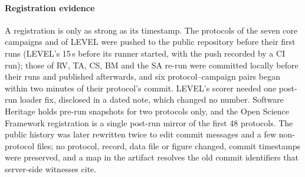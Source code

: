 \paragraph{Registration evidence}
A registration is only as strong as its timestamp. The protocols of the
seven core campaigns and of LEVEL were pushed to the public repository
before their first runs (LEVEL's 15\,s before its runner started, with the
push recorded by a CI run); those of RV, TA, CS, BM and the SA re-run were
committed locally before their runs and published afterwards, and six
protocol--campaign pairs began within two minutes of their protocol's
commit. LEVEL's scorer needed one post-run loader fix, disclosed in a dated
note, which changed no number. Software
Heritage holds pre-run snapshots for two protocols only, and the Open
Science Framework registration is a single post-run mirror of the first 48
protocols. The public history was later rewritten twice to edit commit
messages and a few non-protocol files; no protocol, record, data file or
figure changed, commit timestamps were preserved, and a map in the artifact
resolves the old commit identifiers that server-side witnesses cite.
